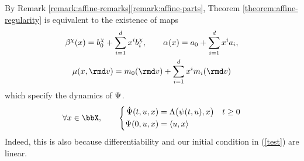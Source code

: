 \begin{remark}
  \label{remark:riccati-affine-formulation}
  By Remark \ref{remark:affine-remarks}\ref{remark:affine-parts}, Theorem \ref{theorem:affine-regularity} is equivalent to the existence of maps
  \begin{equation}
    \begin{gathered}
      \affDrift^\trunc(\stateVar) = \affDriftPart_0^\trunc + \sum_{i=1}^d \stateVar^i \affDriftPart_i^\trunc, \qquad
      \affDiff(\stateVar) = \affDiffPart_0 + \sum_{i=1}^d \stateVar^i \affDiffPart_i, \\
      \affJump(\stateVar, \rmd\markVar) = \affJumpPart_0(\rmd\markVar) + \sum_{i=1}^d \stateVar^i \affJumpPart_i(\rmd\markVar)
    \end{gathered}
  \end{equation}
  which specify the dynamics of $\Psi$.
  \begin{equation}
    \label{test}
  \end{equation}
  \begin{equation}
    \forall \stateVar \in \stateSpace, \qquad \left\{\begin{aligned}
      \dot\aff(t, \momentVar, \stateVar) &= \ode\big(\affPart(t,\momentVar), \stateVar\big) & t \geq 0 \\
      \aff(0,\momentVar, \stateVar) &= \prj{\momentVar}{\stateVar}
    \end{aligned}\right.
  \end{equation}
  Indeed, this is also because differentiability and our initial condition in (\ref{test}) are linear.
\end{remark}
